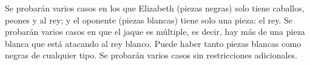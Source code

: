 \documentclass{oci}
\begin{document}
\begin{scoreDescription}
  Se probarán varios casos en los que Elizabeth (piezas negras) solo tiene caballos, peones
  y al rey; y el oponente (piezas blancas) tiene solo una pieza: el rey.
  Se probarán varios casos en que el jaque es múltiple, es decir, hay más de una pieza
  blanca que está atacando al rey blanco.
  Puede haber tanto piezas blancas como negras de cualquier tipo.
  Se probarán varios casos sin restricciones adicionales.
\end{scoreDescription}

\begin{sampleDescription}
\end{sampleDescription}
\end{document}
